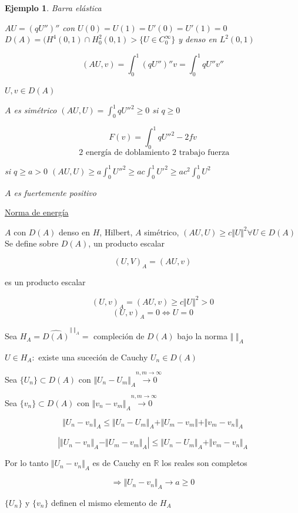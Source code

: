 \documentclass[a4paper,10pt]{book}
\newtheorem{ejemplo}{Ejemplo}
\begin{document}
\begin{ejemplo}
    Barra elástica

    $AU= (qU'')''$ con $U(0)=U(1) = U'(0)=U'(1)=0$  $D(A)= (H^4(0,1)\cap H_0^2(0,1) > \{ U\in C_0^\infty  \}$ y denso en $L^2(0,1)$

    \[
    (AU,v)=\int_0^1 (qU'')'' v = \int_0^1 q U'' v''
    \]

    $U,v\in D(A)$ 

    $A$ es simétrico $(AU,U)= \int_0^1 q {U''}^2 \geq 0  $ si $q\geq 0$

    \[
    F(v)= \int_0^1 q {U''}^2 -2fv
    \]
    \[
    \text{ 2 energía de doblamiento }  \text{2 trabajo fuerza}
    \]

    si $q\geq a>0 $  $(AU,U) \geq a\int_0^1 { U''}^2 \geq a c \int_0^1 {U'}^2  \geq a c^2  \int_0^1 {U}^2 $

    $A$ es fuertemente positivo
\end{ejemplo}

\underline{Norma de energía} 

$A$ con $D(A)$ denso en $H$, Hilbert,
$A$ simétrico, $(AU,U)\geq c\Vert U\Vert^2 \forall U\in D(A)$ Se define sobre $D(A)$, un producto escalar

\[
(U,V)_A=(AU,v)
\]

 es un producto escalar

 \[
 (U,v)_A =(AU,v) \geq c\Vert U\Vert^2 > 0 
 \]
 \[(U,v)_A=0 \Leftrightarrow U=0\]
 
Sea $H_A = \widehat{D(A) }^{\Vert\;\Vert_A} =$ compleción de $D(A)$ bajo la norma $\Vert \;\Vert_A$

$U\in H_A:$ existe una suceción de Cauchy  $U_n\in D(A)$ 

Sea $\{U_n\} \subset D(A)  $  con $\Vert U_n -U_m\Vert_A \overset{n,m\rightarrow \infty}{\rightarrow 0 }$

Sea $\{v_n\} \subset D(A)  $  con $\Vert v_n -v_m\Vert_A \overset{n,m\rightarrow \infty}{\rightarrow 0 }$

\[\Vert U_n -v_n\Vert_A \leq \Vert U_n -U_m\Vert_A + \Vert U_m -v_m\Vert + \Vert v_m -v_n\Vert_A \]

\[
\left| \Vert U_n- v_n\Vert_A -\Vert U_m -v_m \Vert_A \right| \leq \Vert U_n-U_m\Vert_A + \Vert v_m-v_n\Vert_A
\]

Por lo tanto $\Vert U_n -v_n\Vert_A $ es de Cauchy en $\mathbb{R}$ los reales son completos

\[
\Rightarrow \Vert U_n-v_n\Vert_A \rightarrow a\geq 0 
\]

$ \{U_n\}$ y $ \{v_n\}$ definen el mismo elemento de $H_A$
\end{document}
